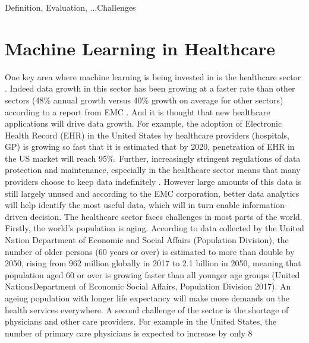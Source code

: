 Definition, Evaluation, ...Challenges

\section{Machine Learning in Healthcare}

One key area where machine learning is being invested in is the healthcare sector \citep{Obermeyer:2016ju,EMC:2014ve, Evans:sHGdqFvY}. Indeed data growth in this sector has been growing at a faster rate than other sectors (48\% annual growth versus 40\% growth on average for other sectors) according to a report from EMC \citep{EMC:2014ve}. And it is thought that new healthcare applications will drive data growth. For example, the adoption of Electronic Health Record (EHR) in the United States by healthcare providers (hospitals, GP) is growing so fast that it is estimated that by 2020, penetration of EHR in the US market will reach 95\%. Further, increasingly stringent regulations of data protection and maintenance, especially in the healthcare sector means that many providers choose to keep data indefinitely \citep{EMC:2014ve}.  However large amounts of this data is still largely unused and according to the EMC corporation, better data analytics will help identify the most useful data, which will in turn enable information-driven decision.
The healthcare sector faces challenges in most parts of the world. Firstly, the world’s population is aging. According to data collected by the United Nation Department of Economic and Social Affairs (Population Division), the number of older persons (60 years or over) is estimated to more than double by 2050, rising from 962 million globally in 2017 to 2.1 billion in 2050, meaning that population aged 60 or over is growing faster than all younger age groups (United NationsDepartment of Economic Social Affairs, Population Division 2017). An ageing population with longer life expectancy will make more demands on the health services everywhere. A second challenge of the sector is the shortage of physicians and other care providers. For example in the United States, the number of primary care physicians is expected to increase by only 8%
